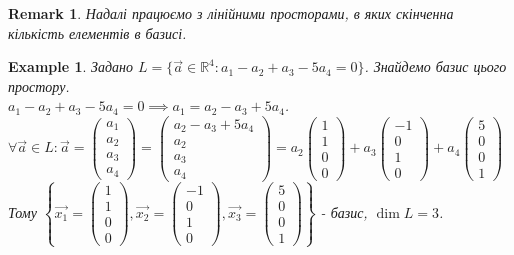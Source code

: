\documentclass[a4paper, 10pt]{article}
\theoremstyle{theoremdd}
\theoremstyle{theoremdd}
\theoremstyle{theoremdd}
\theoremstyle{theoremdd}
\newtheorem{example}[theorem]{Example}
\theoremstyle{theoremdd}
\theoremstyle{theoremdd}
\newtheorem{remark}[theorem]{Remark}
\theoremstyle{theoremdd}
\theoremstyle{theoremdd}
\begin{document}
	\begin{remark}
	Надалі працюємо з лінійними просторами, в яких скінченна кількість елементів в базисі.
	\end{remark}
	
	\begin{example}
	Задано $L = \{\vec{a} \in \mathbb{R}^4: a_1 - a_2 + a_3 - 5a_4 = 0\}$. Знайдемо базис цього простору.\\
	$a_1 - a_2 + a_3 - 5a_4 = 0 \implies a_1 = a_2 - a_3 + 5a_4$.\\
	$\forall \vec{a} \in L: \vec{a} = \begin{pmatrix} a_1 \\ a_2 \\ a_3 \\ a_4 \end{pmatrix} = \begin{pmatrix} a_2 - a_3 + 5a_4 \\ a_2 \\ a_3 \\ a_4 \end{pmatrix} = a_2 \begin{pmatrix} 1 \\ 1 \\ 0 \\ 0\end{pmatrix} + a_3 \begin{pmatrix} -1 \\ 0 \\ 1 \\ 0\end{pmatrix} + a_4 \begin{pmatrix} 5 \\ 0 \\ 0 \\ 1 \end{pmatrix}$\\
	Тому $\left\{\vec{x_1} = \begin{pmatrix} 1 \\ 1 \\ 0 \\ 0\end{pmatrix}, \vec{x_2} = \begin{pmatrix} -1 \\ 0 \\ 1 \\ 0\end{pmatrix}, \vec{x_3} = \begin{pmatrix} 5 \\ 0 \\ 0 \\ 1\end{pmatrix} \right\}$ - базис, $\dim{L} = 3$.

\end{example}
\end{document}
